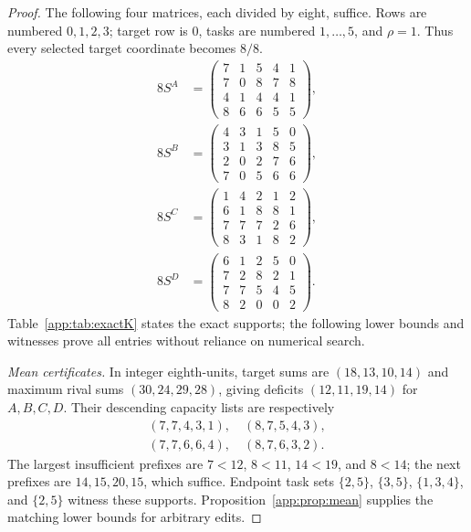 \begin{proof}
The following four matrices, each divided by eight, suffice. Rows are numbered $0,1,2,3$; target row is $0$, tasks are numbered $1,\ldots,5$, and $\rho=1$. Thus every selected target coordinate becomes $8/8$.
\begin{align*}
 8S^A&=\begin{pmatrix}
 7&1&5&4&1\\7&0&8&7&8\\4&1&4&4&1\\8&6&6&5&5
 \end{pmatrix},\\
 8S^B&=\begin{pmatrix}
 4&3&1&5&0\\3&1&3&8&5\\2&0&2&7&6\\7&0&5&6&6
 \end{pmatrix},\\
 8S^C&=\begin{pmatrix}
 1&4&2&1&2\\6&1&8&8&1\\7&7&7&2&6\\8&3&1&8&2
 \end{pmatrix},\\
 8S^D&=\begin{pmatrix}
 6&1&2&5&0\\7&2&8&2&1\\7&7&5&4&5\\8&2&0&0&2
 \end{pmatrix}.
\end{align*}
Table~\ref{app:tab:exactK} states the exact supports; the following lower bounds and witnesses prove all entries without reliance on numerical search.

\begin{table}[t]
\centering
\caption{Exact shared-first supports for four distinct synthetic matrices. These are mathematical examples, not benchmark measurements.}
\label{app:tab:exactK}

\end{table}

\emph{Mean certificates.}
In integer eighth-units, target sums are $(18,13,10,14)$ and maximum rival sums $(30,24,29,28)$, giving deficits $(12,11,19,14)$ for $A,B,C,D$. Their descending capacity lists are respectively
\[
 \begin{gathered}
 (7,7,4,3,1),\quad(8,7,5,4,3),\\
 (7,7,6,6,4),\quad(8,7,6,3,2).
 \end{gathered}
\]
The largest insufficient prefixes are $7<12$, $8<11$, $14<19$, and $8<14$; the next prefixes are $14,15,20,15$, which suffice. Endpoint task sets $\{2,5\}$, $\{3,5\}$, $\{1,3,4\}$, and $\{2,5\}$ witness these supports. Proposition~\ref{app:prop:mean} supplies the matching lower bounds for arbitrary edits.


\end{proof}
